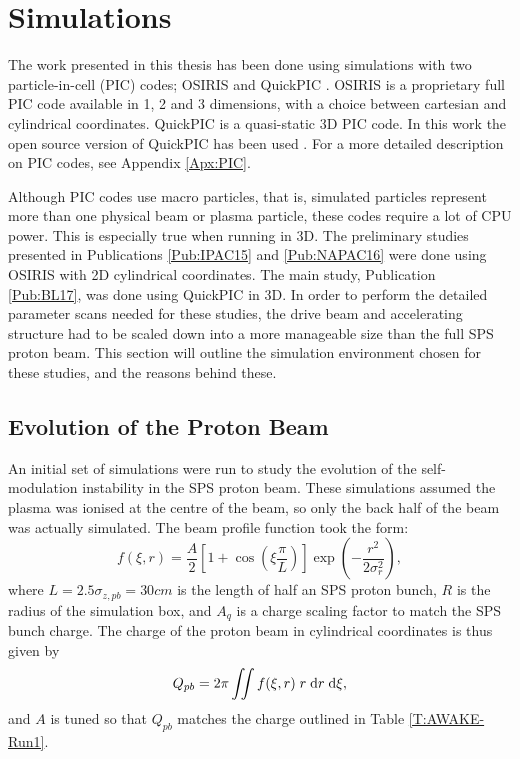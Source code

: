 %
%

\chapter{Simulations}
\label{Ch:Sim}

The work presented in this thesis has been done using simulations with two particle-in-cell (PIC) codes; OSIRIS \cite{fonseca:2002} and QuickPIC \cite{an:2013, huang:2006}. OSIRIS is a proprietary full PIC code available in 1, 2 and 3 dimensions, with a choice between cartesian and cylindrical coordinates. QuickPIC is a quasi-static 3D PIC code. In this work the open source version of QuickPIC has been used \cite{add:quickpic:web}. For a more detailed description on PIC codes, see Appendix \ref{Apx:PIC}.

Although PIC codes use macro particles, that is, simulated particles represent more than one physical beam or plasma particle, these codes require a lot of CPU power. This is especially true when running in 3D. The preliminary studies presented in Publications \ref{Pub:IPAC15} and \ref{Pub:NAPAC16} were done using OSIRIS with 2D cylindrical coordinates. The main study, Publication \ref{Pub:BL17}, was done using QuickPIC in 3D. In order to perform the detailed parameter scans needed for these studies, the drive beam and accelerating structure had to be scaled down into a more manageable size than the full SPS proton beam. This section will outline the simulation environment chosen for these studies, and the reasons behind these.

\section{Evolution of the Proton Beam}
\label{Sim:PBeam}

An initial set of simulations were run to study the evolution of the self-modulation instability in the SPS proton beam. These simulations assumed the plasma was ionised at the centre of the beam, so only the back half of the beam was actually simulated. The beam profile function took the form:
\begin{equation}
    f(\xi,r) = \frac{A}{2} \left[1 + \cos\left(\xi\frac{\pi}{L}\right)\right] \exp\left(-\frac{r^{2}}{2\sigma_{r}^{2}}\right), \label{EQ:SPS-Profile}
\end{equation}
where $L = 2.5\sigma_{z,pb} = 30\unit{cm}$ is the length of half an SPS proton bunch, $R$ is the radius of the simulation box, and $A_{q}$ is a charge scaling factor to match the SPS bunch charge. The charge of the proton beam in cylindrical coordinates is thus given by
\begin{equation}
    Q_{pb} = 2\pi \iint f(\xi,r) \;r \;\mathrm{d}r\;\mathrm{d}\xi, \label{EQ:SPS-Charge}
\end{equation}
and $A$ is tuned so that $Q_{pb}$ matches the charge outlined in Table \ref{T:AWAKE-Run1}.

